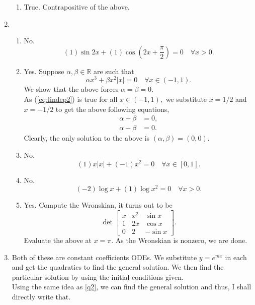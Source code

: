 \documentclass{article}
\begin{document}
\begin{enumerate}[label = Q.\arabic*.]
\begin{enumerate}[label = (\roman*)]
		\item True. Contrapositive of the above.
	\end{enumerate}
	\item 
	\begin{enumerate}[label = (\roman*)] 
		\item No.
		\begin{equation*} 
			(1)\sin2x + (1)\cos\left(2x + \frac{\pi}{2}\right) = 0 \quad \forall x > 0.
		\end{equation*}
		\item Yes. Suppose $\alpha, \beta \in \mathbb{R}$ are such that
		\begin{equation} \label{eq:lindep2} 
			\alpha x^3 + \beta x^2|x| = 0 \quad \forall x \in (-1, 1).
		\end{equation}
		We show that the above forces $\alpha = \beta = 0.$\\
		As (\ref{eq:lindep2}) is true for all $x \in (-1, 1),$ we substitute $x = 1/2$ and $x = -1/2$ to get the above following equations,
		\begin{align*} 
			\alpha + \beta &= 0,\\
			\alpha - \beta &= 0.
		\end{align*}
		Clearly, the only solution to the above is $(\alpha, \beta) = (0, 0).$
		\item No.
		\begin{equation*} 
			(1)x|x| + (-1)x^2 = 0 \quad \forall x \in [0, 1].
		\end{equation*}
		\item No.
		\begin{equation*} 
			(-2)\log x + (1)\log x^2 = 0 \quad \forall x > 0.
		\end{equation*}
		\item Yes. Compute the Wronskian, it turns out to be
		\[\det\begin{bmatrix}
			x & x^2 & \sin x\\
			1 & 2x & \cos x\\
			0 & 2 & -\sin x
		\end{bmatrix}.\]
		Evaluate the above at $x = \pi.$ As the Wronskian is nonzero, we are done.
	\end{enumerate}
	\item Both of these are constant coefficients ODEs. We substitute $y = e^{mx}$ in each and get the quadratics to find the general solution. We then find the particular solution by using the initial conditions given.\\
	Using the same idea as \ref{q2}, we can find the general solution and thus, I shall directly write that.

\end{enumerate}
\end{document}
